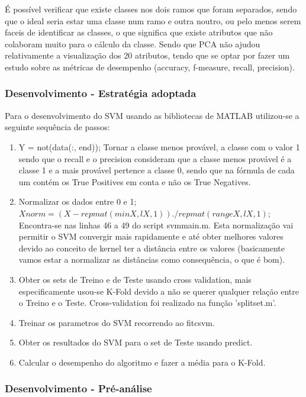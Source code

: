 \documentclass[portugues,final]{revdetua}
\begin{document}
É possível verificar que existe classes nos dois ramos que foram separados, sendo que o ideal seria estar uma classe num ramo e outra noutro, ou pelo menos serem faceis de identificar as classes, o que significa que existe atributos que não colaboram muito para o cálculo da classe. Sendo que PCA não ajudou relativamente a visualização dos 20 atributos, tendo que se optar por fazer um estudo sobre as métricas de desempenho (accuracy, f-measure, recall, precision).

\subsubsection{Desenvolvimento - Estratégia adoptada}

Para o desenvolvimento do SVM usando as bibliotecas de MATLAB utilizou-se a seguinte sequência de passos:
\begin{enumerate}
\item Y = not(data(:, end)); Tornar a classe menos provável, a classe com o valor 1 sendo que o recall e o precision consideram que a classe menos provável é a classe 1 e a mais provável pertence a classe 0, sendo que na fórmula de cada um contém os True Positives em conta e não os True Negatives.
\item Normalizar os dados entre 0 e 1; $Xnorm = (X - repmat(minX, lX, 1)) ./ repmat(rangeX, lX, 1); $\\Encontra-se nas linhas 46 a 49 do script svmmain.m. Esta normalização vai permitir o SVM convergir mais rapidamente e até obter melhores valores devido ao conceito de kernel ter a distância entre os valores (basicamente vamos estar a normalizar as distâncias como consequência, o que é bom).
\item Obter os sets de Treino e de Teste usando cross validation, mais especificamente usou-se K-Fold devido a não se querer qualquer relação entre o Treino e o Teste. Cross-validation foi realizado na função 'splitset.m'.
\item Treinar os parametros do SVM recorrendo ao fitcsvm.
\item Obter os resultados do SVM para o set de Teste usando predict.
\item Calcular o desempenho do algoritmo e fazer a média para o K-Fold.
\end{enumerate}

\subsubsection{Desenvolvimento - Pré-análise}
\end{document}
